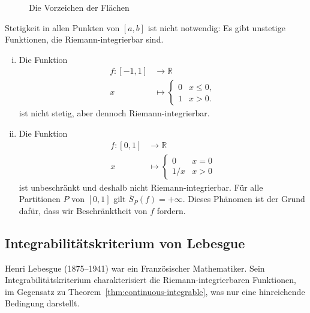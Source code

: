 \documentclass[../main.tex]{subfiles}
\begin{document}
\begin{figure}[htb]
  \centering
  
  \caption{Die Vorzeichen der Flächen}%
  \label{fig:riemann-integral}
\end{figure}

\begin{remark}
  Stetigkeit in allen Punkten von $[a, b]$ ist
  nicht notwendig: Es gibt unstetige Funktionen,
  die Riemann-integrierbar sind.
\end{remark}

\begin{examples}
  \leavevmode
  \begin{enumerate}[(i)]
    \item Die Funktion
      \begin{align*}
        f \colon [-1, 1] & \to \mathbb{R} \\
        x & \mapsto 
        \begin{cases}
          0 & x \leq 0,\\
          1 & x > 0.
        \end{cases}
      \end{align*}
      ist nicht stetig, aber dennoch Riemann-integrierbar.
    \item Die Funktion
      \begin{align*}
        f \colon [0, 1] & \to \mathbb{R} \\
        x & \mapsto 
        \begin{cases}
          0 & x = 0 \\
          1/x & x > 0
        \end{cases}
      \end{align*}
      ist unbeschränkt und deshalb nicht Riemann-integrierbar.
      Für alle Partitionen $P$ von $[0, 1]$ gilt
      $
      \overline S_P(f) = + \infty$.
      Dieses Phänomen ist der Grund dafür, dass
      wir Beschränktheit von $f$ fordern.
  \end{enumerate}
\end{examples}

\subsection*{Integrabilitätskriterium von Lebesgue}
Henri Lebesgue (1875--1941) war ein Französischer Mathematiker.
Sein Integrabilitätskriterium charakterisiert die
Riemann-integrierbaren Funktionen, im Gegensatz zu
Theorem~\ref{thm:continuous-integrable}, was nur eine
hinreichende Bedingung darstellt.
\end{document}
